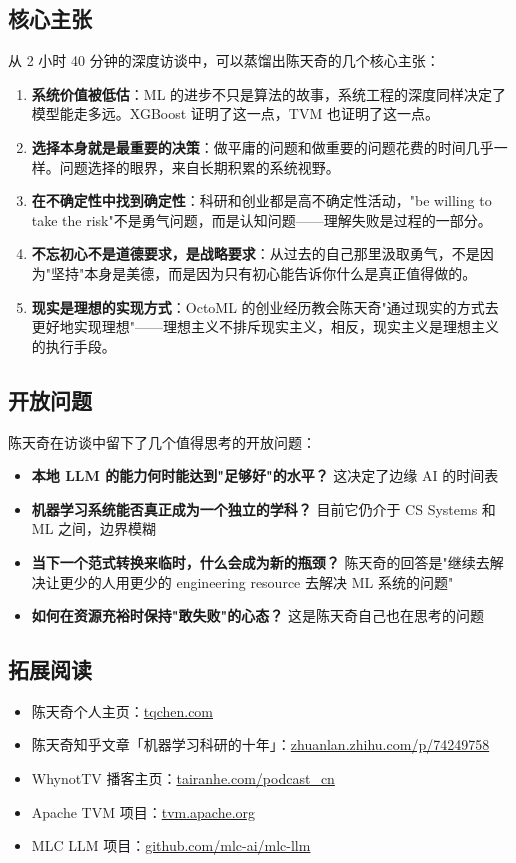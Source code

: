 \documentclass[a4paper]{article}
\begin{document}
\subsection{核心主张}

从 2 小时 40 分钟的深度访谈中，可以蒸馏出陈天奇的几个核心主张：

\begin{enumerate}
\item \textbf{系统价值被低估}：ML 的进步不只是算法的故事，系统工程的深度同样决定了模型能走多远。XGBoost 证明了这一点，TVM 也证明了这一点。
\item \textbf{选择本身就是最重要的决策}：做平庸的问题和做重要的问题花费的时间几乎一样。问题选择的眼界，来自长期积累的系统视野。
\item \textbf{在不确定性中找到确定性}：科研和创业都是高不确定性活动，"be willing to take the risk"不是勇气问题，而是认知问题——理解失败是过程的一部分。
\item \textbf{不忘初心不是道德要求，是战略要求}：从过去的自己那里汲取勇气，不是因为"坚持"本身是美德，而是因为只有初心能告诉你什么是真正值得做的。
\item \textbf{现实是理想的实现方式}：OctoML 的创业经历教会陈天奇"通过现实的方式去更好地实现理想"——理想主义不排斥现实主义，相反，现实主义是理想主义的执行手段。
\end{enumerate}

\subsection{开放问题}

陈天奇在访谈中留下了几个值得思考的开放问题：

\begin{itemize}
\item \textbf{本地 LLM 的能力何时能达到"足够好"的水平？} 这决定了边缘 AI 的时间表
\item \textbf{机器学习系统能否真正成为一个独立的学科？} 目前它仍介于 CS Systems 和 ML 之间，边界模糊
\item \textbf{当下一个范式转换来临时，什么会成为新的瓶颈？} 陈天奇的回答是"继续去解决让更少的人用更少的 engineering resource 去解决 ML 系统的问题"
\item \textbf{如何在资源充裕时保持"敢失败"的心态？} 这是陈天奇自己也在思考的问题
\end{itemize}

\subsection{拓展阅读}

\begin{itemize}
\item 陈天奇个人主页：\href{https://tqchen.com/}{tqchen.com}
\item 陈天奇知乎文章「机器学习科研的十年」：\href{https://zhuanlan.zhihu.com/p/74249758}{zhuanlan.zhihu.com/p/74249758}
\item WhynotTV 播客主页：\href{https://tairanhe.com/podcast\_cn}{tairanhe.com/podcast\_cn}
\item Apache TVM 项目：\href{https://tvm.apache.org/}{tvm.apache.org}
\item MLC LLM 项目：\href{https://github.com/mlc-ai/mlc-llm}{github.com/mlc-ai/mlc-llm}
\end{itemize}
\end{document}
